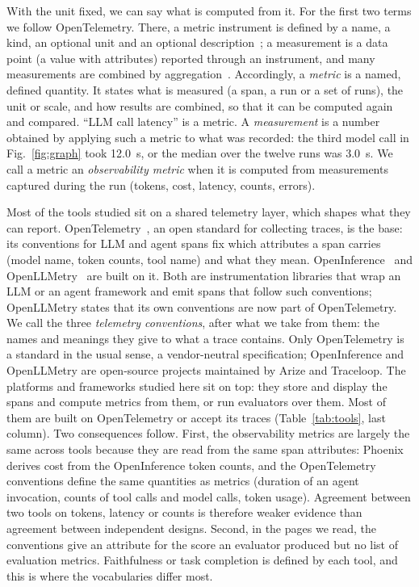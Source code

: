 \documentclass[conference]{IEEEtran}
\begin{document}
With the unit fixed, we can say what is computed from it. For the first two terms we follow OpenTelemetry. There, a metric instrument is defined by a name, a kind, an optional unit and an optional description~\cite{otelmetrics}; a measurement is a data point (a value with attributes) reported through an instrument, and many measurements are combined by aggregation~\cite{otelmetrics,otelmetricsapi}. Accordingly, a \emph{metric} is a named, defined quantity. It states what is measured (a span, a run or a set of runs), the unit or scale, and how results are combined, so that it can be computed again and compared. ``LLM call latency'' is a metric. A \emph{measurement} is a number obtained by applying such a metric to what was recorded: the third model call in Fig.~\ref{fig:graph} took 12.0~s, or the median over the twelve runs was 3.0~s. We call a metric an \emph{observability metric} when it is computed from measurements captured during the run (tokens, cost, latency, counts, errors).

Most of the tools studied sit on a shared telemetry layer, which shapes what they can report. OpenTelemetry~\cite{otelgenai}, an open standard for collecting traces, is the base: its conventions for LLM and agent spans fix which attributes a span carries (model name, token counts, tool name) and what they mean. OpenInference~\cite{tool_openinference} and OpenLLMetry~\cite{tool_openllmetry} are built on it. Both are instrumentation libraries that wrap an LLM or an agent framework and emit spans that follow such conventions; OpenLLMetry states that its own conventions are now part of OpenTelemetry. We call the three \emph{telemetry conventions}, after what we take from them: the names and meanings they give to what a trace contains. Only OpenTelemetry is a standard in the usual sense, a vendor-neutral specification; OpenInference and OpenLLMetry are open-source projects maintained by Arize and Traceloop. The platforms and frameworks studied here sit on top: they store and display the spans and compute metrics from them, or run evaluators over them. Most of them are built on OpenTelemetry or accept its traces (Table~\ref{tab:tools}, last column). Two consequences follow. First, the observability metrics are largely the same across tools because they are read from the same span attributes: Phoenix derives cost from the OpenInference token counts, and the OpenTelemetry conventions define the same quantities as metrics (duration of an agent invocation, counts of tool calls and model calls, token usage). Agreement between two tools on tokens, latency or counts is therefore weaker evidence than agreement between independent designs. Second, in the pages we read, the conventions give an attribute for the score an evaluator produced but no list of evaluation metrics. Faithfulness or task completion is defined by each tool, and this is where the vocabularies differ most.
\end{document}
